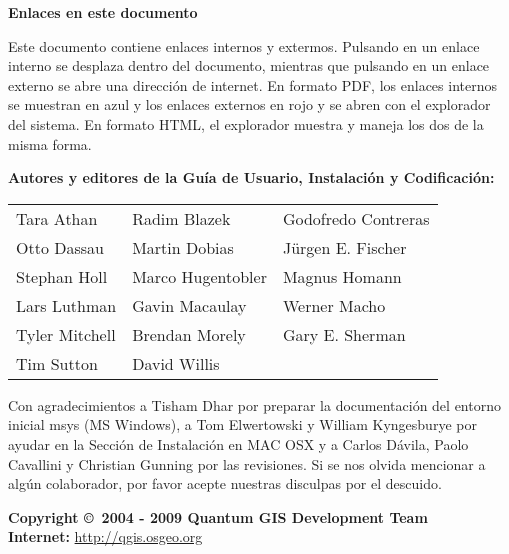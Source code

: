 \textbf{Enlaces en este documento}

Este documento contiene enlaces internos y extermos. Pulsando en un
enlace interno se desplaza dentro del documento, mientras que pulsando en un enlace externo
se abre una dirección de internet. En formato PDF, los enlaces internos se muestran en azul y
los enlaces externos en rojo y se abren con el explorador del 
sistema. En formato HTML, el explorador muestra y maneja los dos de la misma forma. 

\begin{flushleft}
\textbf{Autores y editores de la Guía de Usuario, Instalación y Codificación:}
 
\begin{tabular}{p{5cm} p{5cm} p{5cm}}
Tara Athan & Radim Blazek & Godofredo Contreras \\
Otto Dassau & Martin Dobias & J\"urgen E. Fischer \\ 
Stephan Holl & Marco Hugentobler & Magnus Homann \\ 
Lars Luthman & Gavin Macaulay & Werner Macho \\
Tyler Mitchell & Brendan Morely & Gary E. Sherman \\ 
Tim Sutton & David Willis &  \\
\end{tabular}


Con agradecimientos a Tisham Dhar por preparar la documentación del entorno inicial msys (MS Windows), a Tom 
Elwertowski y William Kyngesburye por ayudar en la Sección de Instalación en MAC OSX y a Carlos Dávila, Paolo 
Cavallini y Christian Gunning por las revisiones. Si se nos olvida mencionar a algún 
colaborador, por favor acepte nuestras disculpas por el descuido.

\textbf{Copyright \copyright~2004 - 2009 Quantum GIS Development Team} \\
\textbf{Internet:} \url{http://qgis.osgeo.org}
\end{flushleft}

